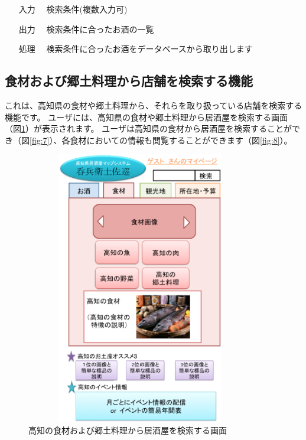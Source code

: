 \documentclass[a4j,titlepage]{jarticle}
\begin{document}
\begin{enumerate}
\item [入力]　検索条件(複数入力可)
\item [出力]　検索条件に合ったお酒の一覧
\item [処理]　検索条件に合ったお酒をデータベースから取り出します
\end{enumerate}


\subsection{食材および郷土料理から店舗を検索する機能}
これは、高知県の食材や郷土料理から、それらを取り扱っている店舗を検索する機能です。
ユーザには、高知県の食材や郷土料理から居酒屋を検索する画面（図\ref{fig:6}）が表示されます。
ユーザは高知県の食材から居酒屋を検索することができ（図\ref{fig:7}）、各食材においての情報も閲覧することができます（図\ref{fig:8}）。

\begin {figure}[htbp]
    \begin{center}
    \includegraphics [height=12cm, width=10cm]{extrnal_design_document_image/6.eps}
    \caption {高知の食材および郷土料理から居酒屋を検索する画面}
    \label {fig:6}
    \end{center}
\end {figure}
\end{document}
